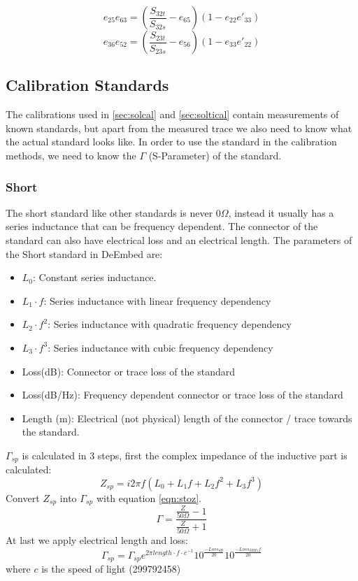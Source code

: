 \begin{equation}
\label{eqn:e25e63_3p}
e_{25}e_{63} = \left(\frac{S_{32t}}{S_{32s}} - e_{65}\right)\left(1-e_{22}e'_{33}\right)
\end{equation}
\begin{equation}
\label{eqn:e36e52_3p}
e_{36}e_{52} = \left(\frac{S_{23t}}{S_{23s}} - e_{56}\right)\left(1-e_{33}e'_{22}\right)
\end{equation}



\subsection{Calibration Standards}
\label{sec:calstds}

The calibrations used in \ref{sec:solcal} and \ref{sec:soltical} contain measurements of known standards, but apart from the measured trace we also need to know what the actual standard looks like. In order to use the standard in the calibration methods, we need to know the $\Gamma$ (S-Parameter) of the standard.
\subsubsection{Short}
\label{sec:shortstd}
The short standard like other standards is never $0\Omega$, instead it usually has a series inductance that can be frequency dependent. The connector of the standard can also have electrical loss and an electrical length. The parameters of the Short standard in DeEmbed are:
\begin{itemize}
	\item $L_0$: Constant series inductance.
	\item $L_1 \cdot f$: Series inductance with linear frequency dependency
	\item $L_2 \cdot f^2$: Series inductance with quadratic frequency dependency
	\item $L_3 \cdot f^3$: Series inductance with cubic frequency dependency
	\item Loss(dB): Connector or trace loss of the standard
	\item Loss(dB/Hz): Frequency dependent connector or trace loss of the standard
	\item Length (m): Electrical (not physical) length of the connector / trace towards the standard.
\end{itemize}
$\Gamma_{sp}$ is calculated in 3 steps, first the complex impedance of the inductive part is calculated:
\begin{equation}
Z_{sp} = i 2 \pi f (L_0 + L_1 f + L_2 f^2 + L_3 f^3)
\end{equation}
Convert $Z_{sp}$ into $\Gamma_{sp}$ with equation \ref{eqn:stoz}.
\begin{equation}
\label{eqn:stoz}
\Gamma=\frac{\frac{Z}{50\Omega}-1}{\frac{Z}{50\Omega}+1}
\end{equation}
At last we apply electrical length and loss:
\begin{equation}
\Gamma_{sp} = \Gamma_{sp} e^{2 \pi length\cdot f\cdot c^{-1}} 10^{\frac{-Loss_{dB}}{20}} 10^{\frac{-Loss_{dBHz} f }{20}}
\end{equation}
where $c$ is the speed of light (299792458)


